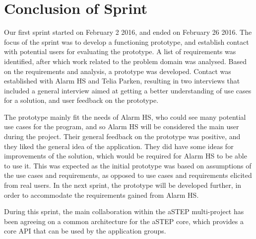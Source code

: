 \section{Conclusion of Sprint}
Our first sprint started on February 2 2016, and ended on February 26 2016. The focus of the sprint was to develop a functioning prototype, and establish contact with potential users for evaluating the prototype. A list of requirements was identified, after which work related to the problem domain was analysed. Based on the requirements and analysis, a prototype was developed. Contact was established with Alarm HS and Telia Parken, resulting in two interviews that included a general interview aimed at getting a better understanding of use cases for a solution, and user feedback on the prototype.

The prototype mainly fit the needs of Alarm HS, who could see many potential use cases for the program, and so Alarm HS will be considered the main user during the project. Their general feedback on the prototype was positive, and they liked the general idea of the application. They did have some ideas for improvements of the solution, which would be required for Alarm HS to be able to use it. This was expected as the initial prototype was based on assumptions of the use cases and requirements, as opposed to use cases and requirements elicited from real users. In the next sprint, the prototype will be developed further, in order to accommodate the requirements gained from Alarm HS.

During this sprint, the main collaboration within the aSTEP multi-project has been agreeing on a common architecture for the aSTEP core, which provides a core API that can be used by the application groups.





